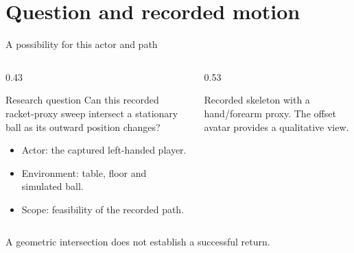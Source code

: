 \begin{frame}\titlepage\end{frame}
\section{Question and recorded motion}
\begin{frame}{A possibility for this actor and path}
\begin{columns}[T,onlytextwidth]
\begin{column}{0.43\textwidth}
\begin{tbox}{Research question}
Can this recorded racket-proxy sweep intersect a stationary ball as its outward position changes?
\end{tbox}
\par\medskip
\begin{itemize}\small
\item Actor: the captured left-handed player.
\item Environment: table, floor and simulated ball.
\item Scope: feasibility of the recorded path.
\end{itemize}
\end{column}
\begin{column}{0.53\textwidth}
\par\smallskip
{\footnotesize Recorded skeleton with a hand/forearm proxy. The offset avatar provides a qualitative view.}
\end{column}
\end{columns}
\begin{ibox}A geometric intersection does not establish a successful return.\end{ibox}
\end{frame}

